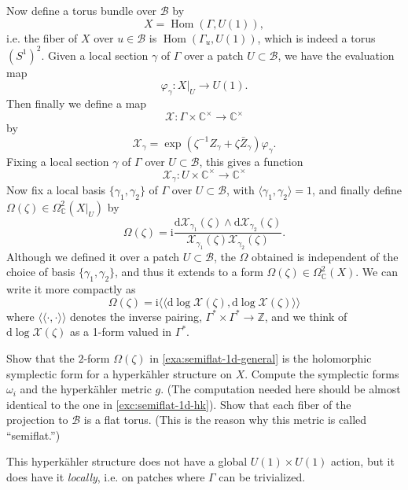 \documentclass[12pt,letterpaper,reqno]{article}
\numberwithin{equation}{section}
\newcommand{\cB}{\ensuremath{\mathcal B}}
\newcommand{\cX}{\ensuremath{\mathcal X}}
\newcommand{\C}{\ensuremath{\mathbb C}}
\newcommand{\Z}{\ensuremath{\mathbb Z}}
\newcommand{\hk}{hyperk\"ahler\xspace}
\newcommand{\I}{{\mathrm i}}
\newcommand{\de}{\mathrm{d}}
\newcommand{\IP}[1]{\langle#1\rangle}
\newcommand{\DIP}[1]{\langle\!\langle#1\rangle\!\rangle}
\newcommand{\ti}[1]{\textit{#1}}
\DeclareMathOperator{\Hom}{Hom}
\begin{document}
\begin{example}
Now define a torus bundle over $\cB$ by
\begin{equation}
  X = \Hom(\Gamma, U(1)),
\end{equation}
i.e. the fiber of $X$ over $u \in \cB$ is $\Hom(\Gamma_u, U(1))$,
which is indeed a torus $(S^1)^2$.
Given a local section $\gamma$ of $\Gamma$ over a patch
$U \subset \cB$, we have the evaluation map
\begin{equation}
  \varphi_\gamma: X \vert_U \to U(1).
\end{equation}
Then finally we define a map
\begin{equation}
  \cX: \Gamma \times \C^\times \to \C^\times
\end{equation}
by
\begin{equation}
  \cX_\gamma = \exp \left(\zeta^{-1} Z_\gamma + \zeta\bar{Z}_\gamma \right) \varphi_\gamma.
\end{equation}
Fixing a local section $\gamma$ of $\Gamma$ over $U \subset \cB$,
this gives a function
\begin{equation}
  \cX_\gamma: U \times \C^\times \to \C^\times
\end{equation}
Now fix a local basis $\{\gamma_1, \gamma_2\}$ of $\Gamma$
over $U \subset \cB$, with $\IP{\gamma_1,\gamma_2} = 1$,
and finally define $\Omega(\zeta) \in \Omega^2_\C(X\vert_U)$
by
\begin{equation}
  \Omega(\zeta) = \I \frac{\de \cX_{\gamma_1}(\zeta) \wedge \de \cX_{\gamma_2}(\zeta)}{\cX_{\gamma_1}(\zeta) \cX_{\gamma_2}(\zeta)}.
\end{equation}
Although we defined it over a patch $U \subset \cB$,
the $\Omega$ obtained is independent of the choice of
basis $\{\gamma_1,\gamma_2\}$, and thus it extends to a form
$\Omega(\zeta) \in \Omega^2_\C(X)$.
We can write it more compactly as
\begin{equation}
  \Omega(\zeta) = \I \DIP{\de \log \cX(\zeta), \de \log \cX(\zeta)}
\end{equation}
where $\DIP{\cdot,\cdot}$ denotes the inverse pairing,
$\Gamma^* \times \Gamma^* \to \Z$, and we think of
$\de \log \cX(\zeta)$ as a 1-form valued in $\Gamma^*$.
\end{example}

\begin{exercise} Show that the $2$-form $\Omega(\zeta)$ in
\autoref{exa:semiflat-1d-general} is the holomorphic symplectic
form for a \hk structure on $X$. Compute the symplectic forms
$\omega_i$ and the \hk metric $g$.
(The computation needed here should be almost 
identical to the one in \autoref{exc:semiflat-1d-hk}).
Show that each fiber of the 
projection to $\cB$ is a flat torus. (This is the reason why
this metric is called ``semiflat.'')
\end{exercise}
This \hk structure does
not have a global $U(1) \times U(1)$ action, but it does have
it \ti{locally}, i.e. on patches where $\Gamma$ can be trivialized.
\end{document}
